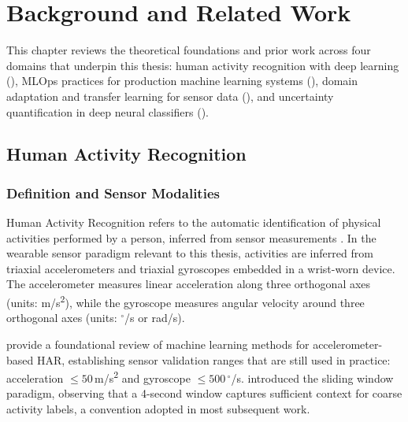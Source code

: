 \chapter{Background and Related Work}
\label{ch:background}

This chapter reviews the theoretical foundations and prior work across four
domains that underpin this thesis: human activity recognition with deep
learning (), MLOps practices for production machine learning
systems (), domain adaptation and transfer learning for
sensor data (), and uncertainty quantification
in deep neural classifiers ().

\section{Human Activity Recognition}
\label{sec:bg_har}

\subsection{Definition and Sensor Modalities}

Human Activity Recognition refers to the automatic identification of
physical activities performed by a person, inferred from sensor measurements
\citep{chen2021deep}.
In the wearable sensor paradigm relevant to this thesis, activities are
inferred from triaxial accelerometers and triaxial gyroscopes embedded in
a wrist-worn device.
The accelerometer measures linear acceleration along three orthogonal axes
(units: m/s\textsuperscript{2}), while the gyroscope measures angular velocity
around three orthogonal axes (units: $^\circ$/s or rad/s).

\citet{mannini2010machine} provide a foundational review of machine learning
methods for accelerometer-based HAR, establishing sensor validation ranges
that are still used in practice: acceleration $\leq 50$\,m/s\textsuperscript{2}
and gyroscope $\leq 500$\,$^\circ$/s.
\citet{bao2004activity} introduced the sliding window paradigm, observing that
a 4-second window captures sufficient context for coarse activity labels, a
convention adopted in most subsequent work.

